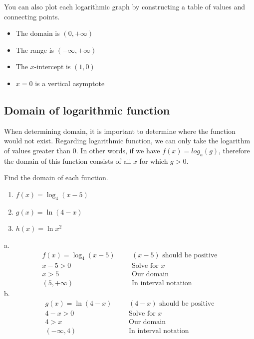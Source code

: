 You can also plot each logarithmic graph by constructing a table of values and 
connecting points. 
\begin{tcolorbox}[title=Characteristics of $\displaystyle \bm{y=log_{a}x}$,         
                    fonttitle=\bfseries,
                    colframe=red!70!black,
                    colback=white]
	\begin{itemize}
		\item The domain is $(0,+\infty)$	
		\item The range is $(-\infty,+\infty)$
		\item The $x$-intercept is $(1,0)$
		\item $x=0$ is a vertical asymptote
	\end{itemize}
\end{tcolorbox}
\subsection{Domain of logarithmic function}
When determining domain, it is important to determine where the function would not exist.
Regarding logarithmic function, we can only take the logarithm of values greater than 0.
In other words, if we have $f(x)=log_{a}(g)$, therefore the domain of this
function consists of all $x$ for which $g>0$.
\begin{exa}
Find the domain of each function.
 \begin{multicols}{2}
 \begin{enumerate}[\bfseries a.]
    \item $f(x) = \log_{4}(x-5)$
    \item $g(x) = \ln{(4-x)}$
    \item $h(x) = \ln{x^2}$
 \end{enumerate}
 \end{multicols}
\end{exa}
% 
a.\begin{align*}
		f(x) = \log_{4}(x-5)&    &	&\text{$(x-5)$ should be positive} \\
		x-5 > 0&	    & &\text{Solve for $x$}\\
		x>5&    	& &\text{Our domain }\\
		(5,+\infty)&    &   &\text{In interval notation}
\end{align*}
b.\begin{align*}
		g(x) = \ln{(4-x)}& &	&\text{$(4-x)$ should be positive} \\
		4-x > 0&	& &\text{Solve for $x$}\\
		4>x&	& &\text{Our domain} \\
		(-\infty,4)&    &   &\text{In interval notation}
\end{align*}
